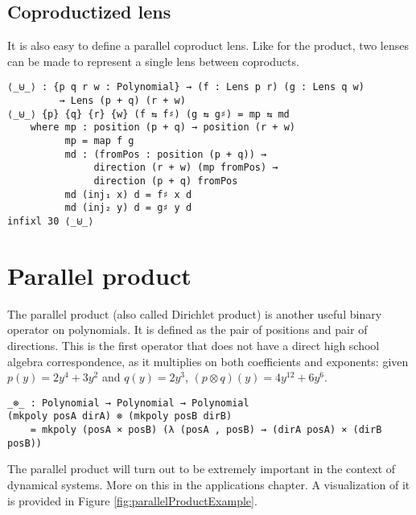 \subsection{Coproductized lens}
It is also easy to define a parallel coproduct lens. Like for the product, two lenses can be made to represent a single lens between coproducts.
\begin{verbatim}
⟨_⊎_⟩ : {p q r w : Polynomial} → (f : Lens p r) (g : Lens q w)
         → Lens (p + q) (r + w)
⟨_⊎_⟩ {p} {q} {r} {w} (f ⇆ f♯) (g ⇆ g♯) = mp ⇆ md
    where mp : position (p + q) → position (r + w)
          mp = map f g
          md : (fromPos : position (p + q)) → 
               direction (r + w) (mp fromPos) → 
               direction (p + q) fromPos
          md (inj₁ x) d = f♯ x d
          md (inj₂ y) d = g♯ y d
infixl 30 ⟨_⊎_⟩
\end{verbatim}

\section{Parallel product} \label{section:parallelProduct}
The parallel product (also called Dirichlet product) is another useful binary operator on polynomials. It is defined as the pair of positions and pair of directions. This is the first operator that does not have a direct high school algebra correspondence, as it multiplies on both coefficients and exponents: given $p(y) = 2y^4 + 3y^2$ and $q(y) = 2y^3$, $(p \otimes q)(y) = 4y^{12} + 6y^6$.

\begin{verbatim}
_⊗_ : Polynomial → Polynomial → Polynomial
(mkpoly posA dirA) ⊗ (mkpoly posB dirB)
    = mkpoly (posA × posB) (λ (posA , posB) → (dirA posA) × (dirB posB))
\end{verbatim}

The parallel product will turn out to be extremely important in the context of dynamical systems. More on this in the applications chapter. A visualization of it is provided in Figure \ref{fig:parallelProductExample}.

